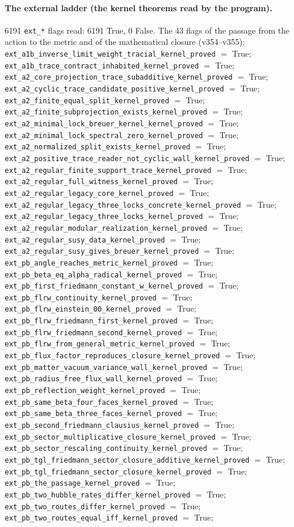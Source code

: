 \documentclass[11pt]{article}
\theoremstyle{definition}\newtheorem{deriv}{Derivation}
\begin{document}
\paragraph*{The external ladder (the kernel theorems read by the program).} 6191 \texttt{ext\_*} flags read: 6191 True, 0 False. The 43 flags of the passage from the action to the metric and of the mathematical closure (v354--v355): \texttt{ext\_a1b\_inverse\_limit\_weight\_tracial\_kernel\_proved} $=$ True; \texttt{ext\_a1b\_trace\_contract\_inhabited\_kernel\_proved} $=$ True; \texttt{ext\_a2\_core\_projection\_trace\_subadditive\_kernel\_proved} $=$ True; \texttt{ext\_a2\_cyclic\_trace\_candidate\_positive\_kernel\_proved} $=$ True; \texttt{ext\_a2\_finite\_equal\_split\_kernel\_proved} $=$ True; \texttt{ext\_a2\_finite\_subprojection\_exists\_kernel\_proved} $=$ True; \texttt{ext\_a2\_minimal\_lock\_breuer\_kernel\_kernel\_proved} $=$ True; \texttt{ext\_a2\_minimal\_lock\_spectral\_zero\_kernel\_proved} $=$ True; \texttt{ext\_a2\_normalized\_split\_exists\_kernel\_proved} $=$ True; \texttt{ext\_a2\_positive\_trace\_reader\_not\_cyclic\_wall\_kernel\_proved} $=$ True; \texttt{ext\_a2\_regular\_finite\_support\_trace\_kernel\_proved} $=$ True; \texttt{ext\_a2\_regular\_full\_witness\_kernel\_proved} $=$ True; \texttt{ext\_a2\_regular\_legacy\_core\_kernel\_proved} $=$ True; \texttt{ext\_a2\_regular\_legacy\_three\_locks\_concrete\_kernel\_proved} $=$ True; \texttt{ext\_a2\_regular\_legacy\_three\_locks\_kernel\_proved} $=$ True; \texttt{ext\_a2\_regular\_modular\_realization\_kernel\_proved} $=$ True; \texttt{ext\_a2\_regular\_susy\_data\_kernel\_proved} $=$ True; \texttt{ext\_a2\_regular\_susy\_gives\_breuer\_kernel\_proved} $=$ True; \texttt{ext\_pb\_angle\_reaches\_metric\_kernel\_proved} $=$ True; \texttt{ext\_pb\_beta\_eq\_alpha\_radical\_kernel\_proved} $=$ True; \texttt{ext\_pb\_first\_friedmann\_constant\_w\_kernel\_proved} $=$ True; \texttt{ext\_pb\_flrw\_continuity\_kernel\_proved} $=$ True; \texttt{ext\_pb\_flrw\_einstein\_00\_kernel\_proved} $=$ True; \texttt{ext\_pb\_flrw\_friedmann\_first\_kernel\_proved} $=$ True; \texttt{ext\_pb\_flrw\_friedmann\_second\_kernel\_proved} $=$ True; \texttt{ext\_pb\_flrw\_from\_general\_metric\_kernel\_proved} $=$ True; \texttt{ext\_pb\_flux\_factor\_reproduces\_closure\_kernel\_proved} $=$ True; \texttt{ext\_pb\_matter\_vacuum\_variance\_wall\_kernel\_proved} $=$ True; \texttt{ext\_pb\_radius\_free\_flux\_wall\_kernel\_proved} $=$ True; \texttt{ext\_pb\_reflection\_weight\_kernel\_proved} $=$ True; \texttt{ext\_pb\_same\_beta\_four\_faces\_kernel\_proved} $=$ True; \texttt{ext\_pb\_same\_beta\_three\_faces\_kernel\_proved} $=$ True; \texttt{ext\_pb\_second\_friedmann\_clausius\_kernel\_proved} $=$ True; \texttt{ext\_pb\_sector\_multiplicative\_closure\_kernel\_proved} $=$ True; \texttt{ext\_pb\_sector\_rescaling\_continuity\_kernel\_proved} $=$ True; \texttt{ext\_pb\_tgl\_friedmann\_sector\_closure\_additive\_kernel\_proved} $=$ True; \texttt{ext\_pb\_tgl\_friedmann\_sector\_closure\_kernel\_proved} $=$ True; \texttt{ext\_pb\_the\_passage\_kernel\_proved} $=$ True; \texttt{ext\_pb\_two\_hubble\_rates\_differ\_kernel\_proved} $=$ True; \texttt{ext\_pb\_two\_routes\_differ\_kernel\_proved} $=$ True; \texttt{ext\_pb\_two\_routes\_equal\_iff\_kernel\_proved} $=$ True; 
\end{document}
